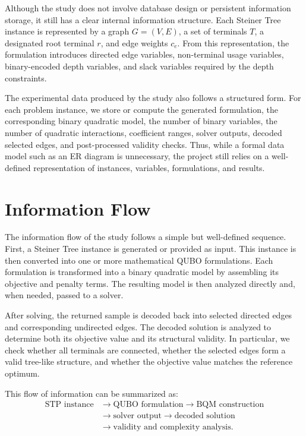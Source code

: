 \documentclass[a4paper,12pt]{report}
\begin{document}
Although the study does not involve database design or persistent information storage, it still has a clear internal information structure. Each Steiner Tree instance is represented by a graph \(G=(V,E)\), a set of terminals \(T\), a designated root terminal \(r\), and edge weights \(c_e\). From this representation, the formulation introduces directed edge variables, non-terminal usage variables, binary-encoded depth variables, and slack variables required by the depth constraints.

The experimental data produced by the study also follows a structured form. For each problem instance, we store or compute the generated formulation, the corresponding binary quadratic model, the number of binary variables, the number of quadratic interactions, coefficient ranges, solver outputs, decoded selected edges, and post-processed validity checks. Thus, while a formal data model such as an ER diagram is unnecessary, the project still relies on a well-defined representation of instances, variables, formulations, and results.

\section{Information Flow}

The information flow of the study follows a simple but well-defined sequence. First, a Steiner Tree instance is generated or provided as input. This instance is then converted into one or more mathematical QUBO formulations. Each formulation is transformed into a binary quadratic model by assembling its objective and penalty terms. The resulting model is then analyzed directly and, when needed, passed to a solver.

After solving, the returned sample is decoded back into selected directed edges and corresponding undirected edges. The decoded solution is analyzed to determine both its objective value and its structural validity. In particular, we check whether all terminals are connected, whether the selected edges form a valid tree-like structure, and whether the objective value matches the reference optimum.

This flow of information can be summarized as:
\[
\begin{aligned}
\text{STP instance}
&\rightarrow \text{QUBO formulation}
\rightarrow \text{BQM construction}
\\
&\rightarrow \text{solver output}
\rightarrow \text{decoded solution}
\\
&\rightarrow \text{validity and complexity analysis}.
\end{aligned}
\]
\end{document}
